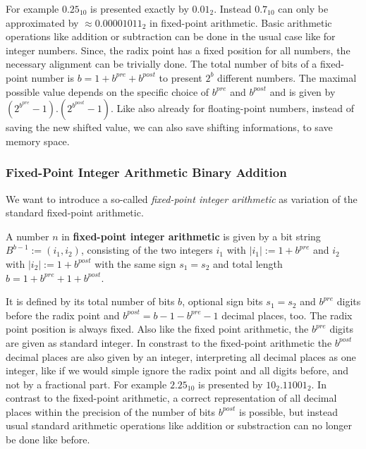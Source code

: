 For example $0.25_{10}$ is presented exactly by $0.01_{2}$. Instead $0.7_{10}$ can only be approximated by $\approx 0.00001011_{2}$ in fixed-point arithmetic. Basic arithmetic operations like addition or subtraction can be done in the usual case like for integer numbers. Since, the radix point has a fixed position for all numbers, the necessary alignment can be trivially done. The total number of bits of a fixed-point number is $b = 1 + b^{pre} + b^{post}$ to present $2^{b}$ different numbers. The maximal possible value depends on the specific choice of $b^{pre}$ and $b^{post}$ and is given by $\left(2^{b^{pre}}-1\right).\left(2^{b^{post}} - 1\right)$. Like also already for floating-point numbers, instead of saving the new shifted value, we can also save shifting informations, to save memory space.
\subsubsection{Fixed-Point Integer Arithmetic Binary Addition}    
\label{sss:fixedpointintegerarithmeticbinaryaddition}
We want to introduce a so-called \textit{fixed-point integer arithmetic} as variation of the standard fixed-point arithmetic.

\begin{definition}
    A number $n$ in \textbf{fixed-point integer arithmetic} is given by a bit string $B^{b-1} := \left(i_{1},i_{2}\right)$, consisting of the two integers $i_{1}$ with $|i_{1}| := 1 + b^{pre}$ and $i_{2}$ with $|i_{2}| := 1 + b^{post}$ with the same sign $s_{1} = s_{2}$ and total length $b = 1 + b^{pre} + 1 + b^{post}$.
\label{def:fixedpointintegerarithmetic}
\end{definition}

It is defined by its total number of bits $b$, optional sign bits $s_{1} = s_{2}$ and $b^{pre}$ digits before the radix point and $b^{post} = b - 1 - b^{pre} - 1$ decimal places, too. The radix point position is always fixed. Also like the fixed point arithmetic, the $b^{pre}$ digits are given as standard integer. In constrast to the fixed-point arithmetic the $b^{post}$ decimal places are also given by an integer, interpreting all decimal places as one integer, like if we would simple ignore the radix point and all digits before, and not by a fractional part. For example $2.25_{10}$ is presented by $10_{2}.11001_{2}$. In contrast to the fixed-point arithmetic, a correct representation of all decimal places within the precision of the number of bits $b^{post}$ is possible, but instead usual standard arithmetic operations like addition or substraction can no longer be done like before.

